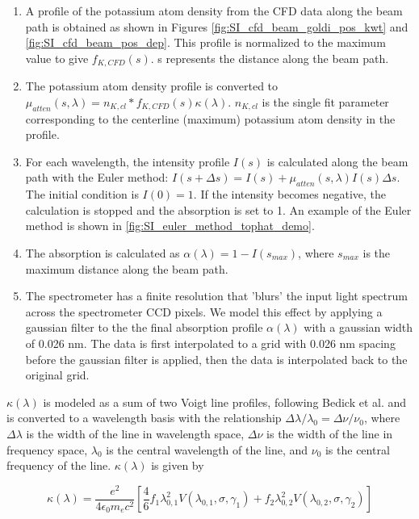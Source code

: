 \begin{enumerate}
    \item A profile of the potassium atom density from the CFD data along the beam path is obtained as shown in Figures \ref{fig:SI_cfd_beam_goldi_pos_kwt} and \ref{fig:SI_cfd_beam_pos_dep}. This profile is normalized to the maximum value to give $f_{K, CFD} (s)$. s represents the distance along the beam path.

    \item The potassium atom density profile is converted to $\mu_{atten} (s, \lambda) = n_{K, cl}* f_{K, CFD} (s) \kappa(\lambda)$. $n_{K, cl}$ is the single fit parameter corresponding to the centerline (maximum) potassium atom density in the profile.
    \item For each wavelength, the intensity profile $I(s)$ is calculated along the beam path with the Euler method: $I(s + \Delta s) = I(s) + \mu_{atten}(s, \lambda) I(s) \Delta s$. The initial condition is $I(0) = 1$. If the intensity becomes negative, the calculation is stopped and the absorption is set to 1. An example of the Euler method is shown in \ref{fig:SI_euler_method_tophat_demo}.
    \item The absorption is calculated as $\alpha(\lambda) = 1 - I(s_{max})$, where $s_{max}$ is the maximum distance along the beam path. 
    \item The spectrometer has a finite resolution that 'blurs' the input light spectrum across the spectrometer CCD pixels. We model this effect by applying a gaussian filter to the the final absorption profile $\alpha(\lambda)$ with a gaussian width of 0.026 nm. The data is first interpolated to a grid with 0.026 nm spacing before the gaussian filter is applied, then the data is interpolated back to the original grid.
\end{enumerate}

$\kappa(\lambda)$ is modeled as a sum of two Voigt line profiles, following Bedick et al.\cite{bedickDeterminationElectricalConductivity2019} and is converted to a wavelength basis with the relationship $\Delta \lambda/\lambda_0 = \Delta \nu/\nu_0$, where $\Delta \lambda$ is the width of the line in wavelength space, $\Delta \nu$ is the width of the line in frequency space, $\lambda_0$ is the central wavelength of the line, and $\nu_0$ is the central frequency of the line. $\kappa(\lambda)$ is given by

\begin{equation}
    \label{eq:cross_section_alpha_fit}
    \kappa(\lambda) = \frac{e^2}{4 \epsilon_0 m_e c^2} \left[ \frac{4}{6} f_1 \lambda_{0,1}^2 V(\lambda_{0,1},\sigma,\gamma_1) + f_2 \lambda_{0,2}^2 V(\lambda_{0,2},\sigma,\gamma_2) \right]
\end{equation}

